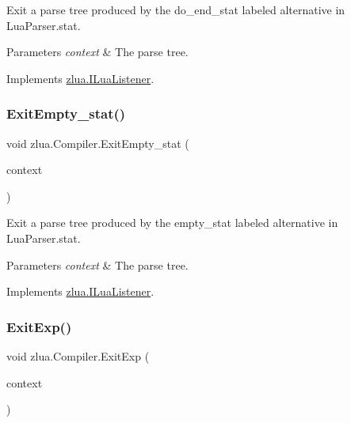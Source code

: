 Exit a parse tree produced by the {\ttfamily do\+\_\+end\+\_\+stat} labeled alternative in Lua\+Parser.\+stat. 


\begin{DoxyParams}{Parameters}
{\em context} & The parse tree.\\
\hline
\end{DoxyParams}


Implements \mbox{\hyperlink{interfacezlua_1_1_i_lua_listener_a21222197a86ad5c425dcab38204a7840}{zlua.\+I\+Lua\+Listener}}.

\mbox{\label{classzlua_1_1_compiler_a6e35167b78ef83dd011df22f00c919a9}} 
\subsubsection{\texorpdfstring{Exit\+Empty\+\_\+stat()}{ExitEmpty\_stat()}}
{\footnotesize\ttfamily void zlua.\+Compiler.\+Exit\+Empty\+\_\+stat (\begin{DoxyParamCaption}\item[{\mbox{[}\+Not\+Null\mbox{]} \mbox{\hyperlink{classzlua_1_1_lua_parser_1_1_empty__stat_context}{Lua\+Parser.\+Empty\+\_\+stat\+Context}}}]{context }\end{DoxyParamCaption})}



Exit a parse tree produced by the {\ttfamily empty\+\_\+stat} labeled alternative in Lua\+Parser.\+stat. 


\begin{DoxyParams}{Parameters}
{\em context} & The parse tree.\\
\hline
\end{DoxyParams}


Implements \mbox{\hyperlink{interfacezlua_1_1_i_lua_listener_a5d6586f89158ceb4a9e683bbc2463ef3}{zlua.\+I\+Lua\+Listener}}.

\mbox{\label{classzlua_1_1_compiler_afab9279bd386382fb1fa91044f5b8e71}} 
\subsubsection{\texorpdfstring{Exit\+Exp()}{ExitExp()}}
{\footnotesize\ttfamily void zlua.\+Compiler.\+Exit\+Exp (\begin{DoxyParamCaption}\item[{\mbox{[}\+Not\+Null\mbox{]} \mbox{\hyperlink{classzlua_1_1_lua_parser_1_1_exp_context}{Lua\+Parser.\+Exp\+Context}}}]{context }\end{DoxyParamCaption})}



